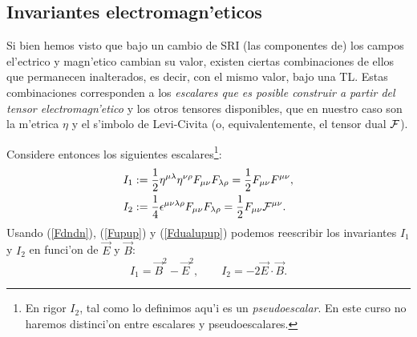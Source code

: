 

\subsection{Invariantes electromagn'eticos}

Si bien hemos visto que bajo un cambio de SRI (las componentes de) los campos
el'ectrico y magn'etico cambian su valor, existen ciertas combinaciones de ellos
que permanecen inalterados, es decir, con el mismo valor, bajo una TL. Estas
combinaciones corresponden a los \textit{escalares que es posible construir a
partir del tensor electromagn'etico} y los otros tensores disponibles, que en
nuestro caso son la m'etrica $\eta$ y el s'imbolo de Levi-Civita (o,
equivalentemente, el tensor dual $\cal F$).

Considere entonces los siguientes escalares\footnote{En rigor $I_2$, tal como lo
definimos aqu'i es un \textit{pseudoescalar}. En este curso no haremos
distinci'on entre escalares y pseudoescalares.}:
\begin{align}
I_1 & :=\frac{1}{2}\eta^{\mu\lambda}\eta^{\nu\rho}F_{\mu\nu}F_{\lambda\rho}=\frac{1}{2}F_{\mu\nu}F^{\mu\nu},\\
I_2 & :=\frac{1}{4}\epsilon^{\mu\nu\lambda\rho}F_{\mu\nu}F_{\lambda\rho}
= \frac{1}{2}F_{\mu\nu}{\cal F}^{\mu\nu}.
\end{align}
Usando (\ref{Fdndn}), (\ref{Fupup}) y (\ref{Fdualupup}) podemos reescribir los
invariantes $I_1$ y $I_2$ en funci'on de $\vec{E}$ y $\vec{B}$:
\begin{equation}
I_1=\vec{B}^2-\vec{E}^2, \qquad I_2  =-2\vec{E}\cdot\vec{B}.
\end{equation}

